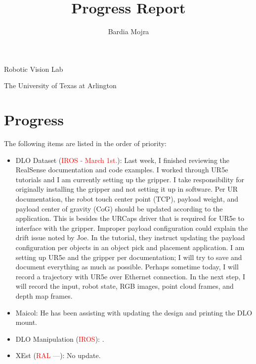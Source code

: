\documentclass[11pt]{article}
\title{Progress Report}
\author{Bardia Mojra}
\begin{document}
\maketitle
\thispagestyle{empty}

\bigskip
\bigskip
\begin{center}
 Robotic Vision Lab
\end{center}

\begin{center}
The University of Texas at Arlington
\end{center}

\newpage



\section{Progress}
The following items are listed in the order of priority:
\begin{itemize}
  \item DLO Dataset (\textcolor{red}{IROS - March 1st.}): Last week, I finished
  reviewing the RealSense documentation and code examples. I worked through UR5e tutorials
  and I am currently setting up the gripper. I take responsibility for originally
  installing the gripper and not setting it up in software. Per UR documentation,
  the robot touch center point (TCP), payload weight, and payload center of
  gravity (CoG) should be updated according to the application. This is besides
  the URCaps driver that is required for UR5e to interface with the gripper.
  Improper payload configuration could explain the drift issue noted by Joe. In
  the tutorial, they instruct updating the payload configuration per objects in
  an object pick and placement application.
  I am setting up UR5e and the gripper per documentation; I will try to save and
  document everything as much as possible. Perhaps sometime today, I will record
  a trajectory with UR5e over Ethernet connection. In the next step, I will
  record the input, robot state, RGB images, point cloud frames, and depth map
  frames.\\
  \item Maicol: He has been assisting with updating the design and printing
  the DLO mount.\\
  \item DLO Manipulation (\textcolor{red}{IROS}): \cite{abraham2017model}.\\
  \item XEst (\textcolor{red}{RAL ---}): No update.\\
  \end{itemize}
\end{document}
